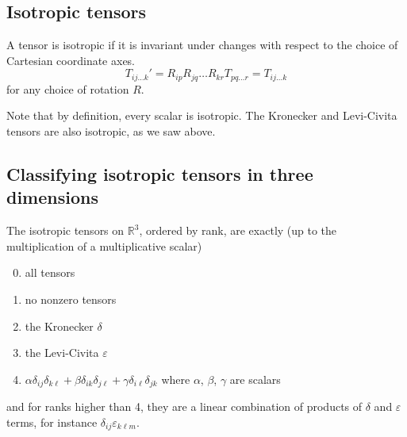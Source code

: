 \subsection{Isotropic tensors}
\begin{definition}
	A tensor is isotropic if it is invariant under changes with respect to the choice of Cartesian coordinate axes.
	\[
		T_{ij\dots k}' = R_{ip} R_{jq} \dots R_{kr} T_{pq\dots r} = T_{ij\dots k}
	\]
	for any choice of rotation \(R\).
\end{definition}
\noindent Note that by definition, every scalar is isotropic.
The Kronecker and Levi-Civita tensors are also isotropic, as we saw above.

\subsection{Classifying isotropic tensors in three dimensions}
\begin{proposition}
	The isotropic tensors on \(\mathbb R^3\), ordered by rank, are exactly (up to the multiplication of a multiplicative scalar)
	\begin{enumerate}[label={Rank \arabic*:}, align=left, leftmargin=*]
		\setcounter{enumi}{-1}
		\item all tensors
		\item no nonzero tensors
		\item the Kronecker \(\delta\)
		\item the Levi-Civita \(\varepsilon\)
		\item \(\alpha \delta_{ij} \delta_{k\ell} + \beta \delta_{ik} \delta_{j\ell} + \gamma \delta_{i\ell} \delta_{jk}\) where \(\alpha\), \(\beta\), \(\gamma\) are scalars
	\end{enumerate}
	and for ranks higher than 4, they are a linear combination of products of \(\delta\) and \(\varepsilon\) terms, for instance \(\delta_{ij}\varepsilon_{k\ell m}\).
\end{proposition}
